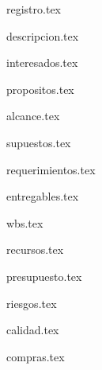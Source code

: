 \documentclass[12pt]{proyecto}
\begin{document}
\maketitle
\thispagestyle{empty}
\pagebreak


\thispagestyle{empty}
{\setlength{\parskip}{0pt}
\tableofcontents{}
}
\pagebreak

{registro.tex}


{descripcion.tex} %

{interesados.tex} %

{propositos.tex}

{alcance.tex} %

{supuestos.tex} %

{requerimientos.tex} %


{entregables.tex} %

{wbs.tex} %

{recursos.tex} %

{presupuesto.tex}
 

{riesgos.tex} %

{calidad.tex} %


{compras.tex} %


\end{document}
